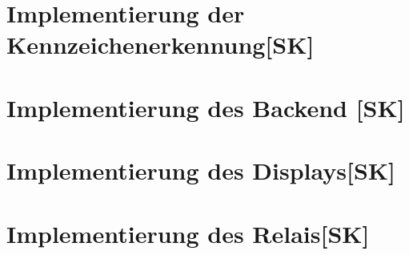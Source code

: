 \section{Implementierung der Kennzeichenerkennung[SK]}

\section{Implementierung des Backend [SK]}

\section{Implementierung des Displays[SK]}

\section{Implementierung des Relais[SK]}
